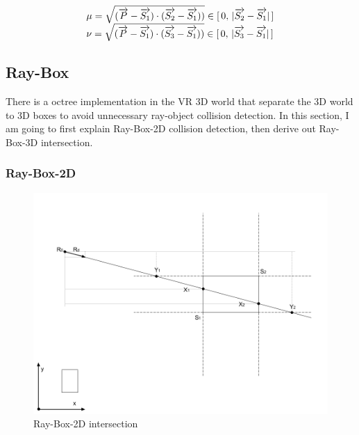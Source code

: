 \[
\begin{array}{lr}
\mu = \sqrt{(\overrightarrow{P} - \overrightarrow{S_1}) \cdot (\overrightarrow{S_2} - \overrightarrow{S_1}))} \in [\,0,\,\lvert \overrightarrow{S_2} - \overrightarrow{S_1} \rvert\,] \\
\nu = \sqrt{(\overrightarrow{P} - \overrightarrow{S_1}) \cdot (\overrightarrow{S_3} - \overrightarrow{S_1}))} \in [\,0,\,\lvert \overrightarrow{S_3} - \overrightarrow{S_1} \rvert\,] 
\end{array}
\]

\subsection{Ray-Box}

There is a octree implementation in the VR 3D world that separate the 3D world to 3D boxes to avoid unnecessary ray-object collision detection. In this section, I am going to first explain Ray-Box-2D collision detection, then derive out Ray-Box-3D intersection.

\subsubsection{Ray-Box-2D}

\begin{figure}[H]\label{fig:ray-box-2d}
\centering
\includegraphics[width=\linewidth]{Figures/ray-box-2d-intersection.png}
\decoRule
\caption[ray-box-2d-intersection]{Ray-Box-2D intersection}
\end{figure}

